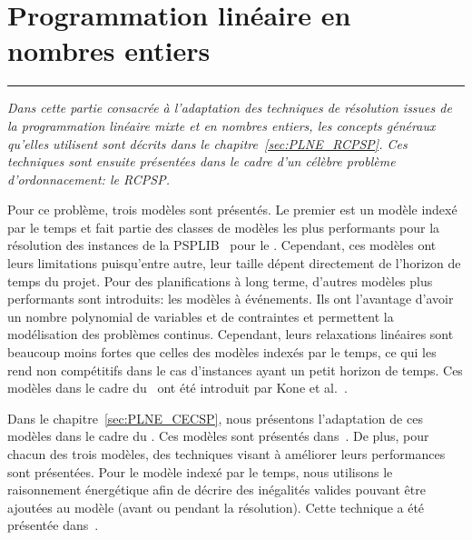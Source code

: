 

\cleardoublepage
\begin{minipage}{0.95\linewidth}
\part{Programmation linéaire en nombres entiers}
\label{part:PLNE}
\vspace{15mm} %
\parttoc 
\end{minipage}
\newpage
\thispagestyle{empty}
\begin{center}
  \begin{minipage}{\textwidth}
    \hrule
    \vspace{0.5cm}
    {\it Dans cette partie consacrée à l'adaptation des techniques de
      résolution issues de la programmation linéaire mixte et en
      nombres entiers, les concepts généraux qu'elles utilisent sont
      décrits dans le chapitre~\ref{sec:PLNE_RCPSP}. Ces techniques sont
      ensuite présentées dans le cadre d'un célèbre problème
      d'ordonnacement: le RCPSP. 

      Pour ce problème, trois modèles sont présentés. Le premier est
      un modèle indexé par le temps et fait partie des classes de modèles
      les plus performants pour la résolution des instances de la
      PSPLIB~\cite{PSPLIB} pour le \RCPSP. Cependant, ces modèles ont leurs
      limitations puisqu'entre autre, leur taille dépent directement de
      l'horizon de temps du projet. Pour des planifications à long terme,
      d'autres modèles plus performants sont introduits: les modèles à
      événements. Ils ont l'avantage d'avoir un nombre polynomial de
      variables et de contraintes et permettent la modélisation des
      problèmes continus. Cependant, leurs relaxations linéaires sont
      beaucoup moins fortes que celles des modèles indexés par le temps,
      ce qui les rend non compétitifs dans le cas d'instances ayant un
      petit horizon de temps. Ces modèles dans le cadre du \RCPSP~ont été
      introduit par Kone et al.~\cite{modele_RCPSP}.

      Dans le chapitre~\ref{sec:PLNE_CECSP}, nous présentons
      l'adaptation de ces modèles dans le cadre du \CECSP. Ces modèles
      sont présentés
      dans~\cite{Nattaf_Constraints,Nattaf_ORSpectrum,Nattaf_CPDP}. De plus,
      pour chacun des trois modèles, des techniques visant à améliorer leurs
      performances sont présentées. Pour le modèle indexé par le
      temps, nous utilisons le raisonnement énergétique afin de
      décrire des inégalités valides pouvant être ajoutées au modèle
      (avant ou pendant la résolution). Cette technique a été
      présentée dans~\cite{Nattaf_JFPC}.

}
\end{minipage}
\end{center}
